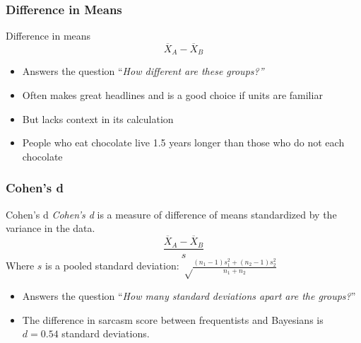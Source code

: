\documentclass[12pt, block=fill]{beamer}
\begin{document}
\begin{frame}
  \frametitle{Difference in Means}

  \begin{block}{Difference in means}
    \[
      \overline{X}_{A} - \overline{X}_{B}
    \]
  \end{block}
    \begin{itemize}
    \item Answers the question ``\textit{How different are these
        groups?''}
    \item Often makes great headlines
      and is a good choice if units are familiar
    \item But lacks context in its calculation
  \item People who eat chocolate live 1.5 years longer than those who
    do not each chocolate
  \end{itemize}
\end{frame}


  \begin{frame}
    \frametitle{Cohen's d}

    \begin{block}{Cohen's d}
      \small
    \textit{Cohen's d} is a measure of difference of means
    standardized by the variance in the data.
    \[
      \frac{ \overline{X}_{A} - \overline{X}_{B} }{s}
    \]
    Where $s$ is a pooled standard deviation:
    $\sqrt \frac{(n_1-1)s_1^2 + (n_2-1)s_2^2}{n_1+n_2}$
  \end{block}

  \begin{itemize}
  \item Answers the question ``\textit{How many standard
      deviations apart are the groups?}''
  \item The difference in sarcasm score between frequentists and
    Bayesians is $d = 0.54$ standard deviations.
  \end{itemize}
\end{frame}
\end{document}
